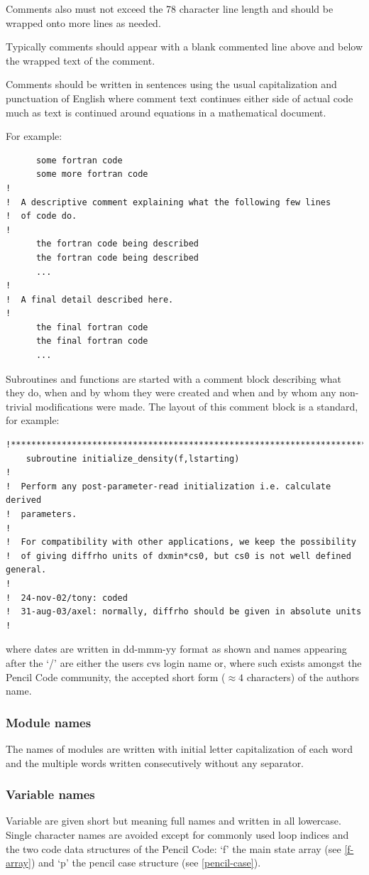 \documentclass[\mydriver,12pt,twoside,notitlepage,a4paper]{article}
\begin{document}
Comments also must not exceed the 78 character line length and should
be wrapped onto more lines as needed.

Typically comments should appear with a blank commented line above and
below the wrapped text of the comment.

Comments should be written in sentences using the usual capitalization
and punctuation of English where comment text continues either side of
actual code much as text is continued around equations in a mathematical
document.

For example:
\begin{verbatim}
      some fortran code
      some more fortran code
!
!  A descriptive comment explaining what the following few lines
!  of code do.
!
      the fortran code being described
      the fortran code being described
      ...
!
!  A final detail described here.
!
      the final fortran code
      the final fortran code
      ...
\end{verbatim}

Subroutines and functions are started with a comment block describing
what they do, when and by whom they were created and when and by whom any
non-trivial modifications were made. The layout of this comment block
is a standard, for example:
\begin{verbatim}
!***********************************************************************
    subroutine initialize_density(f,lstarting)
!
!  Perform any post-parameter-read initialization i.e. calculate derived
!  parameters.
!
!  For compatibility with other applications, we keep the possibility
!  of giving diffrho units of dxmin*cs0, but cs0 is not well defined general.
!
!  24-nov-02/tony: coded
!  31-aug-03/axel: normally, diffrho should be given in absolute units
!
\end{verbatim}
where dates are written in dd-mmm-yy format as shown and names appearing
after the `/' are either the users cvs login name or, where such exists
amongst the {\sc Pencil Code} community, the accepted short form ($\approx 4$
characters) of the authors name.

\subsubsection{Module names}
The names of modules are written with initial letter capitalization
of each word and the multiple words written consecutively without
any separator.

\subsubsection{Variable names}
Variable are given short but meaning full names and written
in all lowercase.  Single character names are avoided except
for commonly used loop indices and the two code data structures
of the {\sc Pencil Code}: `f' the main state array (see \ref{f-array}) and `p' the pencil case
structure (see \ref{pencil-case}).
\end{document}
